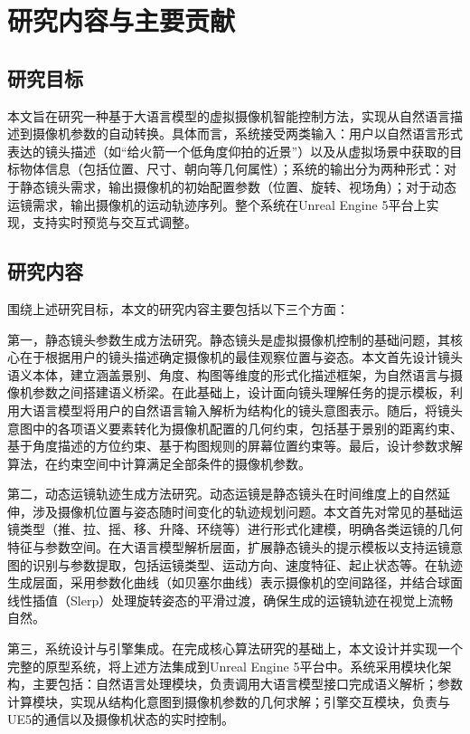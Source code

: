 \section{研究内容与主要贡献}

\subsection{研究目标}

本文旨在研究一种基于大语言模型的虚拟摄像机智能控制方法，实现从自然语言描述到摄像机参数的自动转换。具体而言，系统接受两类输入：用户以自然语言形式表达的镜头描述（如“给火箭一个低角度仰拍的近景”）以及从虚拟场景中获取的目标物体信息（包括位置、尺寸、朝向等几何属性）；系统的输出分为两种形式：对于静态镜头需求，输出摄像机的初始配置参数（位置、旋转、视场角）；对于动态运镜需求，输出摄像机的运动轨迹序列。整个系统在Unreal Engine 5平台上实现，支持实时预览与交互式调整。

\subsection{研究内容}

围绕上述研究目标，本文的研究内容主要包括以下三个方面：

第一，静态镜头参数生成方法研究。静态镜头是虚拟摄像机控制的基础问题，其核心在于根据用户的镜头描述确定摄像机的最佳观察位置与姿态。本文首先设计镜头语义本体，建立涵盖景别、角度、构图等维度的形式化描述框架，为自然语言与摄像机参数之间搭建语义桥梁。在此基础上，设计面向镜头理解任务的提示模板，利用大语言模型将用户的自然语言输入解析为结构化的镜头意图表示。随后，将镜头意图中的各项语义要素转化为摄像机配置的几何约束，包括基于景别的距离约束、基于角度描述的方位约束、基于构图规则的屏幕位置约束等。最后，设计参数求解算法，在约束空间中计算满足全部条件的摄像机参数。

第二，动态运镜轨迹生成方法研究。动态运镜是静态镜头在时间维度上的自然延伸，涉及摄像机位置与姿态随时间变化的轨迹规划问题。本文首先对常见的基础运镜类型（推、拉、摇、移、升降、环绕等）进行形式化建模，明确各类运镜的几何特征与参数空间。在大语言模型解析层面，扩展静态镜头的提示模板以支持运镜意图的识别与参数提取，包括运镜类型、运动方向、速度特征、起止状态等。在轨迹生成层面，采用参数化曲线（如贝塞尔曲线）表示摄像机的空间路径，并结合球面线性插值（Slerp）处理旋转姿态的平滑过渡，确保生成的运镜轨迹在视觉上流畅自然。

第三，系统设计与引擎集成。在完成核心算法研究的基础上，本文设计并实现一个完整的原型系统，将上述方法集成到Unreal Engine 5平台中。系统采用模块化架构，主要包括：自然语言处理模块，负责调用大语言模型接口完成语义解析；参数计算模块，实现从结构化意图到摄像机参数的几何求解；引擎交互模块，负责与UE5的通信以及摄像机状态的实时控制。

